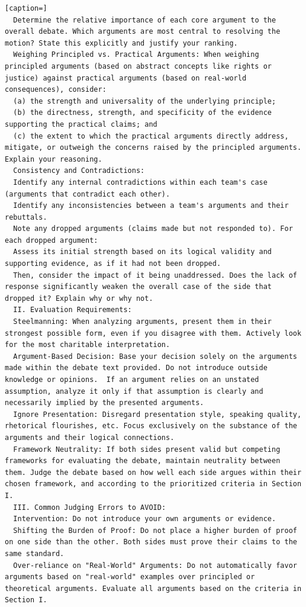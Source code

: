 \documentclass{article}
\begin{document}
\begin{lstlisting}[caption=]
  Determine the relative importance of each core argument to the overall debate. Which arguments are most central to resolving the motion? State this explicitly and justify your ranking.
  Weighing Principled vs. Practical Arguments: When weighing principled arguments (based on abstract concepts like rights or justice) against practical arguments (based on real-world consequences), consider:
  (a) the strength and universality of the underlying principle;
  (b) the directness, strength, and specificity of the evidence supporting the practical claims; and
  (c) the extent to which the practical arguments directly address, mitigate, or outweigh the concerns raised by the principled arguments.  Explain your reasoning.
  Consistency and Contradictions:
  Identify any internal contradictions within each team's case (arguments that contradict each other).
  Identify any inconsistencies between a team's arguments and their rebuttals.
  Note any dropped arguments (claims made but not responded to). For each dropped argument:
  Assess its initial strength based on its logical validity and supporting evidence, as if it had not been dropped.
  Then, consider the impact of it being unaddressed. Does the lack of response significantly weaken the overall case of the side that dropped it? Explain why or why not.
  II. Evaluation Requirements:
  Steelmanning: When analyzing arguments, present them in their strongest possible form, even if you disagree with them. Actively look for the most charitable interpretation.
  Argument-Based Decision: Base your decision solely on the arguments made within the debate text provided. Do not introduce outside knowledge or opinions.  If an argument relies on an unstated assumption, analyze it only if that assumption is clearly and necessarily implied by the presented arguments.
  Ignore Presentation: Disregard presentation style, speaking quality, rhetorical flourishes, etc. Focus exclusively on the substance of the arguments and their logical connections.
  Framework Neutrality: If both sides present valid but competing frameworks for evaluating the debate, maintain neutrality between them. Judge the debate based on how well each side argues within their chosen framework, and according to the prioritized criteria in Section I.
  III. Common Judging Errors to AVOID:
  Intervention: Do not introduce your own arguments or evidence.
  Shifting the Burden of Proof: Do not place a higher burden of proof on one side than the other. Both sides must prove their claims to the same standard.
  Over-reliance on "Real-World" Arguments: Do not automatically favor arguments based on "real-world" examples over principled or theoretical arguments. Evaluate all arguments based on the criteria in Section I.

\end{lstlisting}
\end{document}
